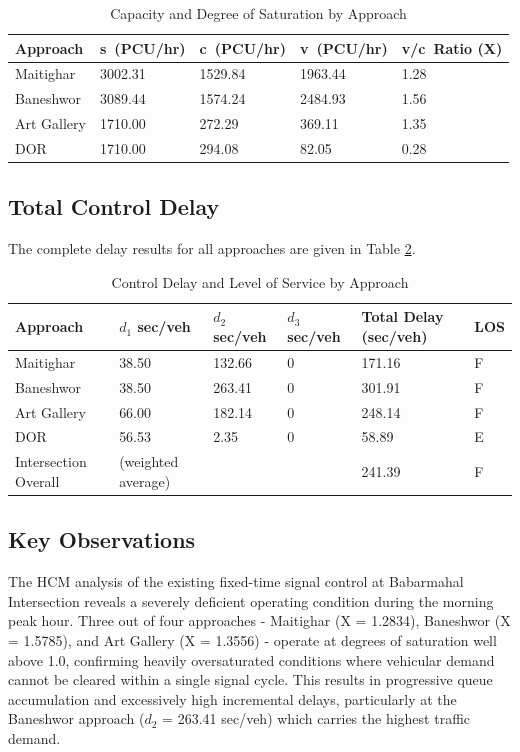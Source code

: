 \begin{table}[h!]
   \centering
   \caption{Capacity and Degree of Saturation by Approach}
   \begin{tabular}{|l|l|l|l|l|}
   \hline
   Approach	& s\ (PCU/hr)	&c\ (PCU/hr)	&v\ (PCU/hr)	&v/c\ Ratio (X) \\
   \hline
   Maitighar	& 3002.31	    &1529.84	&1963.44	&1.28 \\
   \hline
   Baneshwor	& 3089.44	    &1574.24	&2484.93	&1.56 \\
   \hline
   Art Gallery	& 1710.00	    &272.29	    &369.11	    &1.35 \\
   \hline
   DOR	        & 1710.00	    &294.08	    &82.05	    &0.28 \\
   \hline
   \end{tabular}
   \label{tab:cads}
\end{table}

\subsection{Total Control Delay}
The complete delay results for all approaches are 
given in Table \cref{tab:4.6}.

\begin{table} [h!]
   \centering
   \caption{Control Delay and Level of Service by Approach}
   \begin{tabular}{|l|p{2cm}|p{1.5cm}|p{1.5cm}|p{3cm}|l|}
      \hline
      Approach & $d_1$ sec/veh & $d_2$ sec/veh & $d_3$ sec/veh & Total Delay (sec/veh) & LOS \\
      \hline
      Maitighar	&38.50	& 132.66	& 0	& 171.16 & F \\
      \hline
      Baneshwor	& 38.50 &	263.41	& 0	& 301.91 & F \\
      \hline
      Art Gallery	& 66.00	& 182.14	& 0	& 248.14 & F \\
      \hline
      DOR	& 56.53	& 2.35	& 0	& 58.89	& E \\
      \hline
      Intersection Overall & (weighted average) & & & 241.39 & F \\
      \hline
   \end{tabular}
   \label{tab:4.6}
\end{table}

\subsection{Key Observations}

The HCM analysis of the existing fixed-time signal control 
at Babarmahal Intersection reveals a severely deficient 
operating condition during the morning peak hour. Three 
out of four approaches - Maitighar (X = 1.2834), Baneshwor 
(X = 1.5785), and Art Gallery (X = 1.3556) - operate at 
degrees of saturation well above 1.0, confirming heavily 
oversaturated conditions where vehicular demand cannot be 
cleared within a single signal cycle. This results in 
progressive queue accumulation and excessively high 
incremental delays, particularly at the Baneshwor approach 
($d_2$ = 263.41 sec/veh) which carries the highest traffic 
demand.

